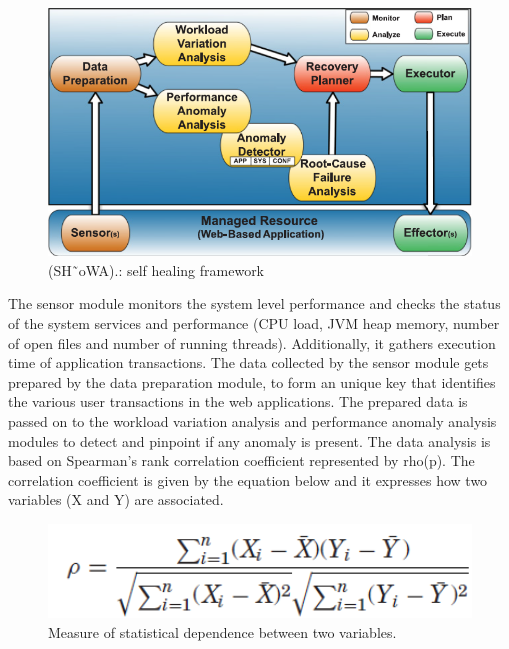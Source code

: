 \begin{compactitem}
\begin{figure}[H]
\center
\includegraphics[width=5in]{img/selfhealingframework}
\caption{(SH˜oWA).: self healing framework}
\end{figure}  

The sensor module monitors the system level performance and checks the status of the system services and performance (CPU load, JVM heap memory, number of open files and number of running threads). Additionally, it gathers execution time of application transactions. The data collected by the sensor module gets prepared by the data preparation module, to form an unique key that identifies the various user transactions in the web applications. The prepared data is passed on to the workload variation analysis and performance anomaly analysis modules to detect and pinpoint if any anomaly is present. The data analysis is based on Spearman's rank correlation coefficient represented by rho(p). The correlation coefficient is given by the equation below and it expresses how two variables (X and Y) are associated.

\begin{figure}[H]
\includegraphics[width=5in]{img/formulae}
\caption{Measure of statistical dependence between two variables.}
\end{figure} 


\end{compactitem}
